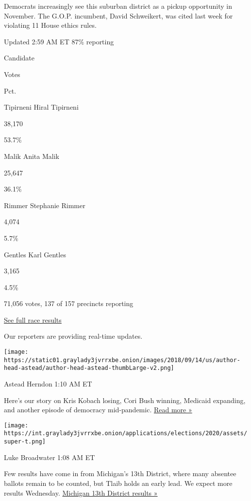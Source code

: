 Democrats increasingly see this suburban district as a pickup
opportunity in November. The G.O.P. incumbent, David Schweikert, was
cited last week for violating 11 House ethics rules.

Updated 2:59 AM ET 87\% reporting

Candidate

Votes

Pct.

Tipirneni Hiral Tipirneni

38,170

53.7\%

Malik Anita Malik

25,647

36.1\%

Rimmer Stephanie Rimmer

4,074

5.7\%

Gentles Karl Gentles

3,165

4.5\%

71,056 votes, 137 of 157 precincts reporting

\href{https://www.nytimes3xbfgragh.onion/interactive/2020/08/04/us/elections/results-arizona-house-district-6-primary-election.html}{See
full race results}

Our reporters are providing real-time updates.

\texttt{[image: https://static01.graylady3jvrrxbe.onion/images/2018/09/14/us/author-head-astead/author-head-astead-thumbLarge-v2.png]}

Astead Herndon 1:10 AM ET

Here's our story on Kris Kobach losing, Cori Bush winning, Medicaid
expanding, and another episode of democracy mid-pandemic.
\href{https://www.nytimes3xbfgragh.onion/2020/08/04/us/politics/kobach-tlaib.html?action=click\&module=ELEX_results\&pgtype=Interactive\&region=ReporterUpdates}{Read
more »}

\texttt{[image: https://int.graylady3jvrrxbe.onion/applications/elections/2020/assets/super-t.png]}

Luke Broadwater 1:08 AM ET

Few results have come in from Michigan's 13th District, where many
absentee ballots remain to be counted, but Tlaib holds an early lead. We
expect more results Wednesday.
\href{https://www.nytimes3xbfgragh.onion/interactive/2020/08/04/us/elections/results-michigan-house-district-13-primary-election.html?action=click\&module=ELEX_results\&pgtype=Interactive\&region=ReporterUpdates}{Michigan
13th District results »}

